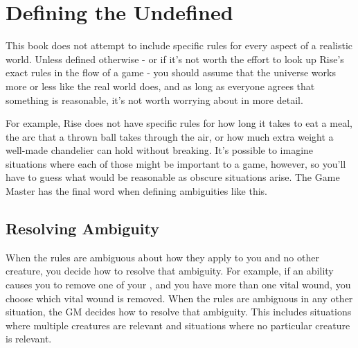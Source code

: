\section{Defining the Undefined}
  This book does not attempt to include specific rules for every aspect of a realistic world.
  Unless defined otherwise - or if it's not worth the effort to look up Rise's exact rules in the flow of a game - you should assume that the universe works more or less like the real world does, and as long as everyone agrees that something is reasonable, it's not worth worrying about in more detail.

  For example, Rise does not have specific rules for how long it takes to eat a meal, the arc that a thrown ball takes through the air, or how much extra weight a well-made chandelier can hold without breaking.
  It's possible to imagine situations where each of those might be important to a game, however, so you'll have to guess what would be reasonable as obscure situations arise.
  The Game Master has the final word when defining ambiguities like this.

  \subsection{Resolving Ambiguity}\label{Resolving Ambiguity}
    When the rules are ambiguous about how they apply to you and no other creature, you decide how to resolve that ambiguity.
    For example, if an ability causes you to remove one of your , and you have more than one vital wound, you choose which vital wound is removed.
    When the rules are ambiguous in any other situation, the GM decides how to resolve that ambiguity.
    This includes situations where multiple creatures are relevant and situations where no particular creature is relevant.
